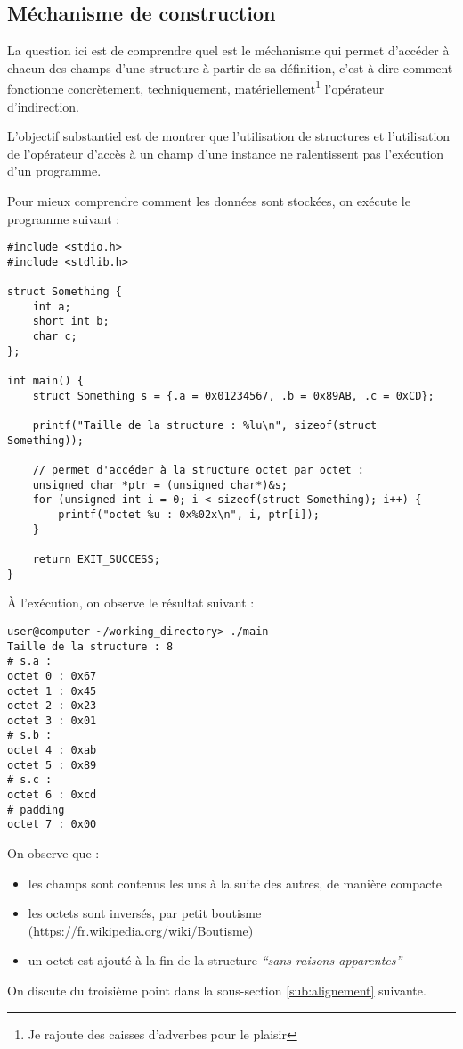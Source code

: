 \documentclass[../../../main.tex]{subfiles}
\begin{document}
\subsection{Méchanisme de construction}
La question ici est de comprendre quel est le méchanisme qui permet d'accéder à chacun des champs d'une structure à partir de sa définition, c'est-à-dire comment fonctionne concrètement, techniquement, matériellement\footnote{Je rajoute des caisses d'adverbes pour le plaisir} l'opérateur d'indirection.

L'objectif substantiel est de montrer que l'utilisation de structures et l'utilisation de l'opérateur d'accès à un champ d'une instance ne ralentissent pas l'exécution d'un programme.

Pour mieux comprendre comment les données sont stockées, on exécute le programme suivant :
\begin{verbatim}
#include <stdio.h>
#include <stdlib.h>

struct Something {
	int a;
	short int b;
	char c;
};

int main() {
	struct Something s = {.a = 0x01234567, .b = 0x89AB, .c = 0xCD};

	printf("Taille de la structure : %lu\n", sizeof(struct Something));

	// permet d'accéder à la structure octet par octet :
	unsigned char *ptr = (unsigned char*)&s; 
	for (unsigned int i = 0; i < sizeof(struct Something); i++) {
		printf("octet %u : 0x%02x\n", i, ptr[i]);
	}

	return EXIT_SUCCESS;
}
\end{verbatim}
À l'exécution, on observe le résultat suivant :
\begin{verbatim}
user@computer ~/working_directory> ./main
Taille de la structure : 8
# s.a :
octet 0 : 0x67
octet 1 : 0x45
octet 2 : 0x23
octet 3 : 0x01
# s.b :
octet 4 : 0xab
octet 5 : 0x89
# s.c :
octet 6 : 0xcd
# padding
octet 7 : 0x00
\end{verbatim}
On observe que :
\begin{itemize}
	\item les champs sont contenus les uns à la suite des autres, de manière compacte
	\item les octets sont inversés, par petit boutisme (\url{https://fr.wikipedia.org/wiki/Boutisme})
	\item un octet est ajouté à la fin de la structure \textit{``sans raisons apparentes''}
\end{itemize}
On discute du troisième point dans la sous-section \ref{sub:alignement} suivante.
\end{document}
